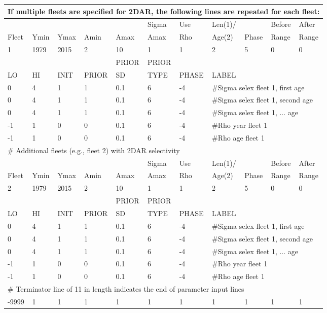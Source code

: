 \begin{longtable}{p{1cm} p{1cm} p{1cm} p{1.25cm} p{1.25cm} p{1.25cm} p{1.2cm} p{1.2cm} p{1cm} p{1cm} p{1cm}}
	\multicolumn{11}{l}{If multiple fleets are specified for 2DAR, the following lines are repeated for each fleet:} \\
	\hline
	\Tstrut &    &      &      &      & Sigma & Use & Len(1)/ &       & Before & After \\
	Fleet & Ymin & Ymax & Amin & Amax & Amax  & Rho & Age(2)  & Phase & Range  & Range \Bstrut\\
	\hline
	   1    & 1979 & 2015 &  2   &  10  & 1     & 1   & 2       & 5     & 0   & 0 \Tstrut\\
	\hline
	     &    &      &     & PRIOR & PRIOR &       &     & & & \Tstrut\\
	LO & HI & INIT & PRIOR & SD    & TYPE  & PHASE & \multicolumn{4}{l}{LABEL} \Bstrut\\
	\hline
	 0 & 4 & 1 & 1 & 0.1 & 6 & -4 & \multicolumn{4}{l}{\#Sigma selex fleet 1, first age} \Tstrut\\
	 0 & 4 & 1 & 1 & 0.1 & 6 & -4 & \multicolumn{4}{l}{\#Sigma selex fleet 1, second age} \Tstrut\\
	 0 & 4 & 1 & 1 & 0.1 & 6 & -4 & \multicolumn{4}{l}{\#Sigma selex fleet 1, ... age} \Tstrut\\
	-1 & 1 & 0 & 0 & 0.1 & 6 & -4 & \multicolumn{4}{l}{\#Rho year fleet 1} \\
	-1 & 1 & 0 & 0 & 0.1 & 6 & -4 & \multicolumn{4}{l}{\#Rho age fleet 1} \\
	\hline
	\multicolumn{11}{l}{\# Additional fleets (e.g., fleet 2) with 2DAR selectivity} \\
	\Tstrut &    &      &      &      & Sigma & Use & Len(1)/ &       & Before & After \\
	Fleet & Ymin & Ymax & Amin & Amax & Amax  & Rho & Age(2)  & Phase & Range  & Range \Bstrut\\
	\hline
	2    & 1979 & 2015 &  2   &  10  & 1     & 1   & 2       & 5     & 0   & 0 \Tstrut\\
		\hline
	&    &      &       & PRIOR & PRIOR &       &     & & & \Tstrut\\
	LO & HI & INIT & PRIOR & SD    & TYPE  & PHASE & \multicolumn{4}{l}{LABEL} \Bstrut\\
	\hline
	0 & 4 & 1 & 1 & 0.1 & 6 & -4 & \multicolumn{4}{l}{\#Sigma selex fleet 1, first age} \Tstrut\\
	0 & 4 & 1 & 1 & 0.1 & 6 & -4 & \multicolumn{4}{l}{\#Sigma selex fleet 1, second age} \Tstrut\\
	0 & 4 & 1 & 1 & 0.1 & 6 & -4 & \multicolumn{4}{l}{\#Sigma selex fleet 1, ... age} \Tstrut\\
	-1 & 1 & 0 & 0 & 0.1 & 6 & -4 & \multicolumn{4}{l}{\#Rho year fleet 1} \\
	-1 & 1 & 0 & 0 & 0.1 & 6 & -4 & \multicolumn{4}{l}{\#Rho age fleet 1} \\
	\hline
	\multicolumn{11}{l}{\# Terminator line of 11 in length indicates the end of parameter input lines} \\
	-9999 & 1 & 1 & 1 & 1 & 1 & 1 & 1 & 1 & 1 & 1 \\
	\hline
\end{longtable}


